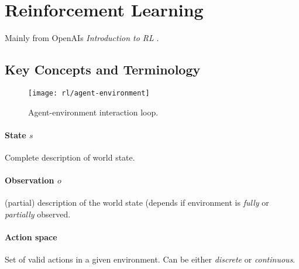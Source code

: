 \section{Reinforcement Learning}
Mainly from OpenAIs \textit{Introduction to RL} \cite{rl-openai}.
\subsection{Key Concepts and Terminology}
\begin{figure}
\centering
\texttt{[image: rl/agent-environment]}
\caption{Agent-environment interaction loop.}\label{fig:agent-env}
\end{figure}

\paragraph{State $s$} Complete description of world state.

\paragraph{Observation $o$} (partial) description of the world state (depends if environment is \textit{fully} or \textit{partially} observed.

\paragraph{Action space} Set of valid actions in a given environment. Can be either \textit{discrete} or \textit{continuous}.

